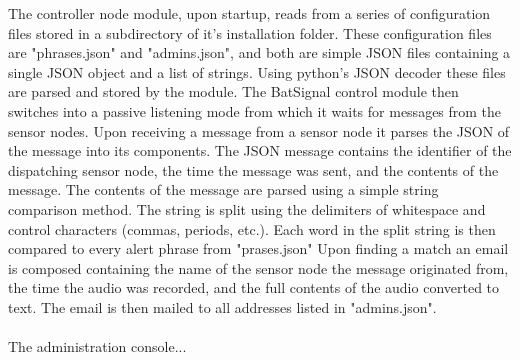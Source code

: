 \documentclass[11pt,a4paper]{article}
\begin{document}
The controller node module, upon startup, reads from a series of configuration files stored in a subdirectory of it's installation folder. These configuration files are "phrases.json" and "admins.json", and both are simple JSON files containing a single JSON object and a list of strings. Using python's JSON decoder these files are parsed and stored by the module. The BatSignal control module then switches into a passive listening mode from which it waits for messages from the sensor nodes. Upon receiving a message from a sensor node it parses the JSON of the message into its components. The JSON message contains the identifier of the dispatching sensor node, the time the message was sent, and the contents of the message. The contents of the message are parsed using a simple string comparison method. The string is split using the delimiters of whitespace and control characters (commas, periods, etc.). Each word in the split string is then compared to every alert phrase from "prases.json"  Upon finding a match an email is composed containing the name of the sensor node the message originated from, the time the audio was recorded, and the full contents of the audio converted to text. The email is then mailed to all addresses listed in "admins.json".  \\\\
The administration console... 
\end{document}
